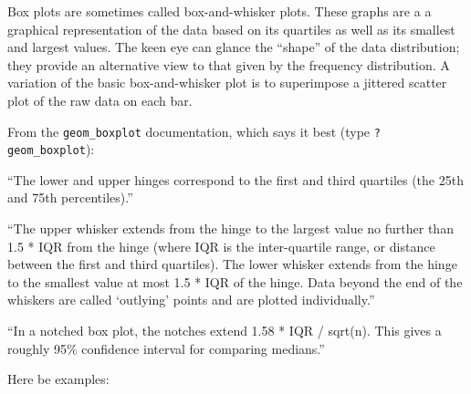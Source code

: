 \documentclass[english,10pt,a4paper,oneside]{book}
\theoremstyle{definition}
\theoremstyle{definition}
\theoremstyle{definition}
\theoremstyle{remark}
\begin{document}
Box plots are sometimes called box-and-whisker plots. These graphs are a
a graphical representation of the data based on its quartiles as well as
its smallest and largest values. The keen eye can glance the
\enquote{shape} of the data distribution; they provide an alternative
view to that given by the frequency distribution. A variation of the
basic box-and-whisker plot is to superimpose a jittered scatter plot of
the raw data on each bar.

From the \texttt{geom\_boxplot} documentation, which says it best (type
\texttt{?geom\_boxplot}):

\enquote{The lower and upper hinges correspond to the first and third
quartiles (the 25th and 75th percentiles).}

\enquote{The upper whisker extends from the hinge to the largest value
no further than 1.5 * IQR from the hinge (where IQR is the
inter-quartile range, or distance between the first and third
quartiles). The lower whisker extends from the hinge to the smallest
value at most 1.5 * IQR of the hinge. Data beyond the end of the
whiskers are called \enquote{outlying} points and are plotted
individually.}

\enquote{In a notched box plot, the notches extend 1.58 * IQR / sqrt(n).
This gives a roughly 95\% confidence interval for comparing medians.}

Here be examples:
\end{document}
